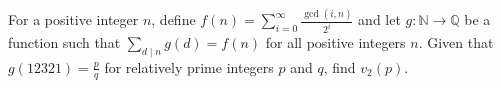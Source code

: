 For a positive integer $n$, define $f(n)=\sum_{i=0}^{\infty}\frac{\gcd(i,n)}{2^i}$ and let $g:\mathbb N\rightarrow \mathbb Q$ be a function such that $\sum_{d\mid n}g(d)=f(n)$ for all positive integers $n$. Given that $g(12321)=\frac{p}{q}$ for relatively prime integers $p$ and $q$, find $v_2(p)$.
